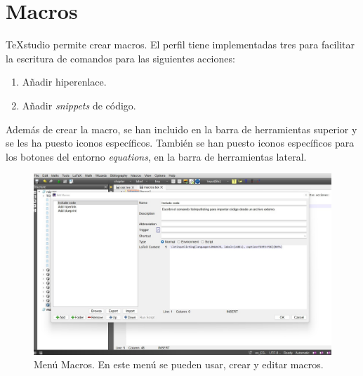 \chapter{Macros}
TeXstudio permite crear macros. El perfil tiene implementadas tres para facilitar la escritura de comandos para las siguientes acciones:
\begin{enumerate}
	\item Añadir hiperenlace.
	\item Añadir \textit{snippets} de código.
\end{enumerate}

Además de crear la macro, se han incluido en la barra de herramientas superior y se les ha puesto iconos específicos. También se han puesto iconos específicos para los botones del entorno \textit{equations}, en la barra de herramientas lateral.

\begin{figure}[h]
	\centering
	\includegraphics[width=1\linewidth, frame]{anexos/macros/imagenes/menu-macros}
	\caption[Menú Macros.]{Menú Macros. En este menú se pueden usar, crear y editar macros.}
	\label{fig:menu-macros}
\end{figure}


